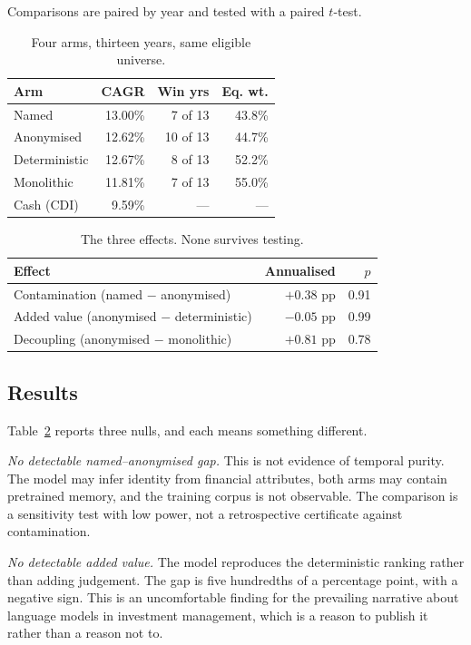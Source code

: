 \documentclass[10pt,conference]{IEEEtran}
\begin{document}
Comparisons are paired by year and tested with a paired $t$-test.

\begin{table}[t]
\caption{Four arms, thirteen years, same eligible universe.}
\centering
\small
\begin{tabular}{lrrr}
\toprule
Arm & CAGR & Win yrs & Eq. wt. \\
\midrule
Named & 13.00\% & 7 of 13 & 43.8\% \\
Anonymised & 12.62\% & 10 of 13 & 44.7\% \\
Deterministic & 12.67\% & 8 of 13 & 52.2\% \\
Monolithic & 11.81\% & 7 of 13 & 55.0\% \\
\midrule
Cash (CDI) & 9.59\% & --- & --- \\
\bottomrule
\end{tabular}
\label{tab:arms}
\end{table}

\begin{table}[t]
\caption{The three effects. None survives testing.}
\centering
\begin{tabular}{lrr}
\toprule
Effect & Annualised & $p$ \\
\midrule
Contamination (named $-$ anonymised) & $+0.38$ pp & 0.91 \\
Added value (anonymised $-$ deterministic) & $-0.05$ pp & 0.99 \\
Decoupling (anonymised $-$ monolithic) & $+0.81$ pp & 0.78 \\
\bottomrule
\end{tabular}
\label{tab:effects}
\end{table}

\subsection{Results}

Table~\ref{tab:effects} reports three nulls, and each means something different.

\emph{No detectable named--anonymised gap.} This is not evidence of temporal purity. The model may infer identity from financial attributes, both arms may contain pretrained memory, and the training corpus is not observable. The comparison is a sensitivity test with low power, not a retrospective certificate against contamination.

\emph{No detectable added value.} The model reproduces the deterministic ranking rather than adding judgement. The gap is five hundredths of a percentage point, with a negative sign. This is an uncomfortable finding for the prevailing narrative about language models in investment management, which is a reason to publish it rather than a reason not to.
\end{document}
